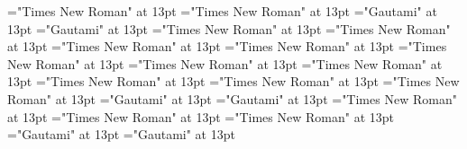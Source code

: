\documentclass[a4paper]{article}
\begin{document}
\font\spanenCmPossibilitypublishStemTransTypeNamePubenspanspanspansensespanentryletDatadicBody="Times New Roman" at 13pt
\font\spanenspanspanspansensespanentryletDatadicBody="Times New Roman" at 13pt
\font\translationLdtespanspansensespanentryletDatadicBody="Gautami" at 13pt
\font\spantetranslationLdtespanspansensespanentryletDatadicBody="Gautami" at 13pt
\font\spanentranslationLdtespanspansensespanentryletDatadicBody="Times New Roman" at 13pt
\font\spanenspansensespanentryletDatadicBody="Times New Roman" at 13pt
\font\semanticdomainabbrenspansensespanentryletDatadicBody="Times New Roman" at 13pt
\font\spanensemanticdomainabbrenspansensespanentryletDatadicBody="Times New Roman" at 13pt
\font\semanticdomainnameenspansensespanentryletDatadicBody="Times New Roman" at 13pt
\font\spanensemanticdomainnameenspansensespanentryletDatadicBody="Times New Roman" at 13pt
\font{}="Times New Roman" at 13pt
\font\xitemendefinitionLdensensespanentryletDatadicBody="Times New Roman" at 13pt
\font\spanenxitemendefinitionLdensensespanentryletDatadicBody="Times New Roman" at 13pt
\font\spanendefinitionLdensensespanentryletDatadicBody="Times New Roman" at 13pt
\font\xitemtedefinitionLdensensespanentryletDatadicBody="Gautami" at 13pt
\font\spantexitemtedefinitionLdensensespanentryletDatadicBody="Gautami" at 13pt
\font\LexSensepublishStemGlossPubLdensensespanentryletDatadicBody="Times New Roman" at 13pt
\font\xitemenLexSensepublishStemGlossPubLdensensespanentryletDatadicBody="Times New Roman" at 13pt
\font\spanenxitemenLexSensepublishStemGlossPubLdensensespanentryletDatadicBody="Times New Roman" at 13pt
\font\xitemteLexSensepublishStemGlossPubLdensensespanentryletDatadicBody="Gautami" at 13pt
\font\spantexitemteLexSensepublishStemGlossPubLdensensespanentryletDatadicBody="Gautami" at 13pt
\end{document}
